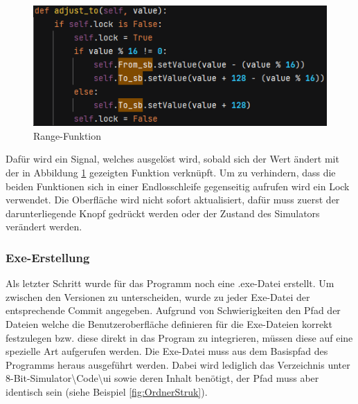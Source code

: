 \documentclass[12pt]{article}
\newcommand{\imgSpaceBefore}{\vspace{10pt}}
\begin{document}
\begin{figure}[H]
\centering
\includegraphics[width=12cm]{bilder/Range_to}
\caption{Range-Funktion}
\label{fig:RangeTo}
\end{figure}

\noindent
Dafür wird ein Signal, welches ausgelöst wird, sobald sich der Wert ändert mit der in Abbildung \ref{fig:RangeTo} gezeigten Funktion verknüpft. Um zu verhindern, dass die beiden Funktionen sich in einer Endlosschleife gegenseitig aufrufen wird ein Lock verwendet. Die Oberfläche wird nicht sofort aktualisiert, dafür muss zuerst der darunterliegende Knopf gedrückt werden oder der Zustand des Simulators verändert werden.

\newpage
\subsubsection{Exe-Erstellung}
Als letzter Schritt wurde für das Programm noch eine .exe-Datei erstellt. Um zwischen den Versionen zu unterscheiden, wurde zu jeder Exe-Datei der entsprechende Commit angegeben. Aufgrund von Schwierigkeiten den Pfad der Dateien welche die Benutzeroberfläche definieren für die Exe-Dateien korrekt festzulegen bzw. diese direkt in das Program zu integrieren, müssen diese auf eine spezielle Art aufgerufen werden. Die Exe-Datei muss aus dem Basispfad des Programms heraus ausgeführt werden. Dabei wird lediglich das Verzeichnis unter 8-Bit-Simulator\textbackslash Code\textbackslash ui sowie deren Inhalt benötigt, der Pfad muss aber identisch sein (siehe Beispiel \ref{fig:OrdnerStruk}).\imgSpaceBefore
\end{document}
